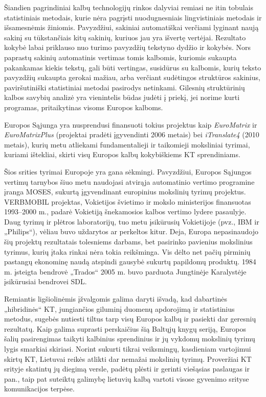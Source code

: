 \documentclass[]{../metanetpaper}
\begin{document}
\begin{multicols}{2}
Šiandien pagrindiniai kalbų technologijų rinkos dalyviai remiasi ne itin tobulais statistiniais metodais, kurie nėra pagrįsti nuodugnesniais lingvistiniais metodais ir išsamesnėmis žiniomis. Pavyzdžiui, sakiniai automatiškai verčiami lyginant naują sakinį su tūkstančiais kitų sakinių, kuriuos jau yra išvertę vertėjai. Rezultato kokybė labai priklauso nuo turimo pavyzdžių tekstyno dydžio ir kokybės. Nors paprastų sakinių automatinis vertimas tomis kalbomis, kuriomis sukaupta pakankamas kiekis tekstų, gali būti vertingas, susidūrus su kalbomis, kurių teksto pavyzdžių sukaupta gerokai mažiau, arba verčiant sudėtingos struktūros sakinius, paviršutiniški statistiniai metodai pasirodys netinkami. Gilesnių struktūrinių kalbos savybių analizė yra vienintelis būdas judėti į priekį, jei norime kurti programas, pritaikytinas visoms Europos kalboms.


Europos Sąjunga yra nusprendusi finansuoti tokius projektus kaip \textit{EuroMatrix }  ir \textit{EuroMatrixPlus} (projektai pradėti įgyvendinti 2006 metais) bei \textit{ iTranslate4} (2010 metais), kurių metu atliekami fundamentalieji ir taikomieji moksliniai tyrimai, kuriami ištekliai, skirti visų Europos kalbų kokybiškiems KT sprendiniams.

 Šios srities tyrimai Europoje yra gana sėkmingi. Pavyzdžiui, Europos Sąjungos vertimų tarnybos šiuo metu naudojasi atvirąja automatinio vertimo programine įranga MOSES, sukurtą įgyvendinant europinius mokslinių tyrimų projektus. VERBMOBIL projektas, Vokietijos švietimo ir mokslo ministerijos finansuotas 1993–2000 m.,  padarė Vokietiją šnekamosios kalbos vertimo lydere pasaulyje. Daug tyrimų ir plėtros laboratorijų, tuo metu įsikūrusių Vokietijoje (pvz., IBM ir „Philips“), vėliau buvo uždarytos ar perkeltos kitur. Deja, Europa nepasinaudojo šių projektų rezultatais tolesniems darbams, bet pasirinko pavienius mokslinius tyrimus, kurių įtaka rinkai nėra tokia reikšminga. Vis dėlto net pačių pirminių pastangų ekonominę naudą atspindi gausybė sukurtų papildomų produktų. 1984 m. įsteigta bendrovė „Trados“ 2005 m. buvo parduota Jungtinėje Karalystėje įsikūrusiai bendrovei SDL.


Remiantis ligšiolinėmis įžvalgomis galima daryti išvadą, kad dabartinės „hibridinės“ KT, jungiančios giluminį duomenų apdorojimą ir statistinius metodus, sugebės nutiesti tiltus tarp visų Europos kalbų ir pasiekti dar geresnių rezultatų. Kaip galima suprasti perskaičius šią Baltųjų knygų seriją,  Europos šalių pasirengimas taikyti kalbinius sprendinius ir jų vykdomų mokslinių tyrimų lygis smarkiai skiriasi. Norint sukurti tikrai veiksmingų, kasdieniam vartojimui skirtų KT, Lietuvai reikės atlikti dar nemažai mokslinių tyrimų. Proveržiai KT srityje skatintų jų diegimą versle, padėtų plėsti ir gerinti viešąsias paslaugas ir pan., taip pat suteiktų galimybę lietuvių kalbą vartoti visose gyvenimo srityse  komunikacijos terpėse. 


\end{multicols}
\end{document}
